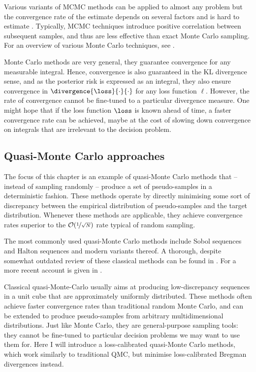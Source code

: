 Various variants of MCMC methods can be applied to almost any problem but the convergence rate of the estimate depends on several factors and is hard to estimate \citep{CowlesCarlin96}. Typically, MCMC techniques introduce positive correlation between subsequent samples, and thus are less effective than exact Monte Carlo sampling. For an overview of various Monte Carlo techniques, see \citep{Murray2007}.

Monte Carlo methods are very general, they guarantee convergence for any measurable integral. Hence, convergence is also guaranteed in the KL divergence sense, and as the posterior risk is expressed as an integral, they also ensure convergence in $\divergence{\loss}{\cdot}{\cdot}$ for any loss function $\ell$. However, the rate of convergence cannot be fine-tuned to a particular divergence measure. One might hope that if the loss function $\loss$ is known ahead of time, a faster convergence rate can be achieved, maybe at the cost of slowing down convergence on integrals that are irrelevant to the decision problem.

\subsection{Quasi-Monte Carlo approaches}

The focus of this chapter is an example of quasi-Monte Carlo methods that -- instead of sampling randomly -- produce a set of pseudo-samples in a deterministic fashion. These methods operate by directly minimising some sort of discrepancy between the empirical distribution of pseudo-samples and the target distribution. Whenever these methods are applicable, they achieve convergence rates superior to the $\mathcal{O}(\nicefrac{1}{\sqrt{N}})$ rate typical of random sampling.

The most commonly used quasi-Monte Carlo methods include Sobol sequences \citep{Sobol1967,Sobol1998} and Halton sequences \citep{Halton1964} and modern variants thereof. A thorough, despite somewhat outdated review of these classical methods can be found in \citep{Niederreiter1992}. For a more recent account is given in \citep{Lemieux2009}.

Classical quasi-Monte-Carlo usually aims at producing low-discrepancy sequences in a unit cube that are approximately uniformly distributed. These methods often achieve faster convergence rates than traditional random Monte Carlo, and can be extended to produce pseudo-samples from arbitrary multidimensional distributions. Just like Monte Carlo, they are general-purpose sampling tools: they cannot be fine-tuned to particular decision problems we may want to use them for. Here I will introduce a loss-calibrated quasi-Monte Carlo methods, which work similarly to traditional QMC, but minimise loss-calibrated Bregman divergences instead.

